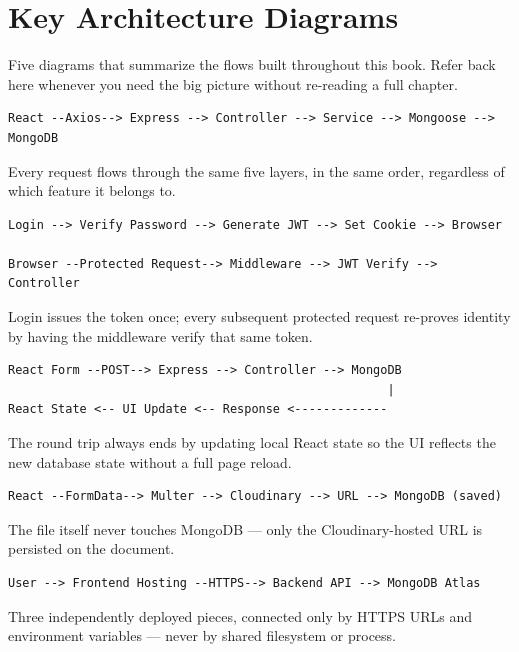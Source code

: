 \chapter{Key Architecture Diagrams}

\begin{notebox}[NOTE]
Five diagrams that summarize the flows built throughout this book. Refer
back here whenever you need the big picture without re-reading a full
chapter.
\end{notebox}

\begin{diagrambox}
\begin{verbatim}
React --Axios--> Express --> Controller --> Service --> Mongoose --> MongoDB
\end{verbatim}
\end{diagrambox}
Every request flows through the same five layers, in the same order,
regardless of which feature it belongs to.

\begin{diagrambox}
\begin{verbatim}
Login --> Verify Password --> Generate JWT --> Set Cookie --> Browser

Browser --Protected Request--> Middleware --> JWT Verify --> Controller
\end{verbatim}
\end{diagrambox}
Login issues the token once; every subsequent protected request re-proves
identity by having the middleware verify that same token.

\begin{diagrambox}
\begin{verbatim}
React Form --POST--> Express --> Controller --> MongoDB
                                                     |
React State <-- UI Update <-- Response <-------------
\end{verbatim}
\end{diagrambox}
The round trip always ends by updating local React state so the UI
reflects the new database state without a full page reload.

\begin{diagrambox}
\begin{verbatim}
React --FormData--> Multer --> Cloudinary --> URL --> MongoDB (saved)
\end{verbatim}
\end{diagrambox}
The file itself never touches MongoDB --- only the Cloudinary-hosted
URL is persisted on the document.

\begin{diagrambox}
\begin{verbatim}
User --> Frontend Hosting --HTTPS--> Backend API --> MongoDB Atlas
\end{verbatim}
\end{diagrambox}
Three independently deployed pieces, connected only by HTTPS URLs and
environment variables --- never by shared filesystem or process.
